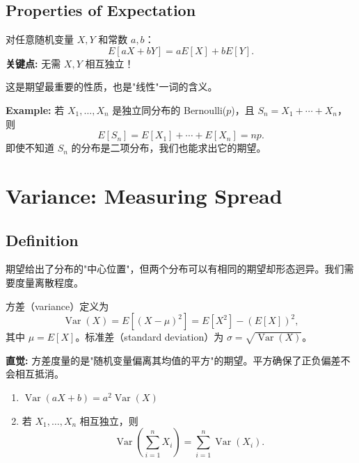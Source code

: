 \subsection{Properties of Expectation}\label{sub:expectation-properties}

\begin{Theorem}[期望的线性性]\label{prop:expectation-linearity}
对任意随机变量 $X, Y$ 和常数 $a, b$：
\[
E[aX + bY] = aE[X] + bE[Y].
\]
\textbf{关键点:} 无需 $X, Y$ 相互独立！
\end{Theorem}

这是期望最重要的性质，也是"线性"一词的含义。

\bigskip

\textbf{Example:} 若 $X_1, \ldots, X_n$ 是独立同分布的 Bernoulli($p$)，且 $S_n = X_1 + \cdots + X_n$，则
\[
E[S_n] = E[X_1] + \cdots + E[X_n] = np.
\]
即使不知道 $S_n$ 的分布是二项分布，我们也能求出它的期望。

\section{Variance: Measuring Spread}\label{sec:variance}

\subsection{Definition}\label{sub:variance-def}

期望给出了分布的"中心位置"，但两个分布可以有相同的期望却形态迥异。我们需要度量离散程度。

\begin{Definition}[方差]\label{def:variance}
方差（variance）定义为
\[
\operatorname{Var}(X) = E[(X - \mu)^2] = E[X^2] - (E[X])^2,
\]
其中 $\mu = E[X]$。标准差（standard deviation）为 $\sigma = \sqrt{\operatorname{Var}(X)}$。
\end{Definition}

\textbf{直觉:} 方差度量的是"随机变量偏离其均值的平方"的期望。平方确保了正负偏差不会相互抵消。

\begin{Theorem}[方差的性质]\label{prop:variance-properties}
\begin{enumerate}
    \item $\operatorname{Var}(aX + b) = a^2 \operatorname{Var}(X)$
    \item 若 $X_1, \ldots, X_n$ 相互独立，则
    \[
    \operatorname{Var}\left(\sum_{i=1}^{n} X_i\right) = \sum_{i=1}^{n} \operatorname{Var}(X_i).
    \]
\end{enumerate}
\end{Theorem}

